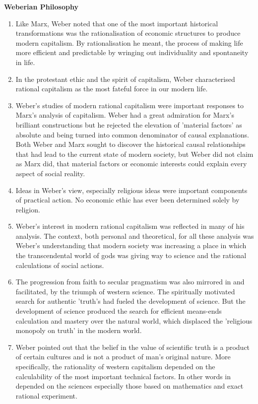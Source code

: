 \documentclass[10pt]{article}
\begin{document}
        \textbf{Weberian Philosophy}
        \begin{enumerate}
        \item
        Like Marx, Weber noted that one of the most important historical transformations was the rationalisation of economic structures to produce modern capitalism. By rationalisation he meant, the process of making life more efficient and predictable by wringing out individuality and spontaneity in life. 
        \item
        In the protestant ethic and the spirit of capitalism, Weber characterised rational capitalism as the most fateful force in our modern life. 
        \item
        Weber's studies of modern rational capitalism were important responses to Marx's analysis of capitalism. Weber had a great admiration for Marx's brilliant constructions but he rejected the elevation of 'material factors' as absolute and being turned into common denominator of causal explanations. Both Weber and Marx sought to discover the historical causal relationships that had lead to the current state of modern society, but Weber did not claim as Marx did, that material factors or economic interests could explain every aspect of social reality.
        \item
        Ideas in Weber's view, especially religious ideas were important components of practical action. No economic ethic has ever been determined solely by religion.
        \item
        Weber's interest in modern rational capitalism was reflected in many of his analysis. The context, both personal and theoretical, for all these analysis was Weber's understanding that modern society was increasing a place in which the transcendental world of gods was giving way to science and the rational calculations of social actions.
        \item
        The progression from faith to secular pragmatism was also mirrored in and facilitated, by the triumph of western science. The spiritually motivated search for authentic 'truth's had fueled the development of science. But the development of science produced the search for efficient means-ends calculation and mastery over the natural world, which displaced the 'religious monopoly on truth' in the modern world.
        \item
        Weber pointed out that the belief in the value of scientific truth is a product of certain cultures and is not a product of man's original nature. More specifically, the rationality of western capitalism depended on the calculability of the most important technical factors. In other words in depended on the sciences especially those based on mathematics and exact rational experiment. 
        \end{enumerate}
        
\end{document}

